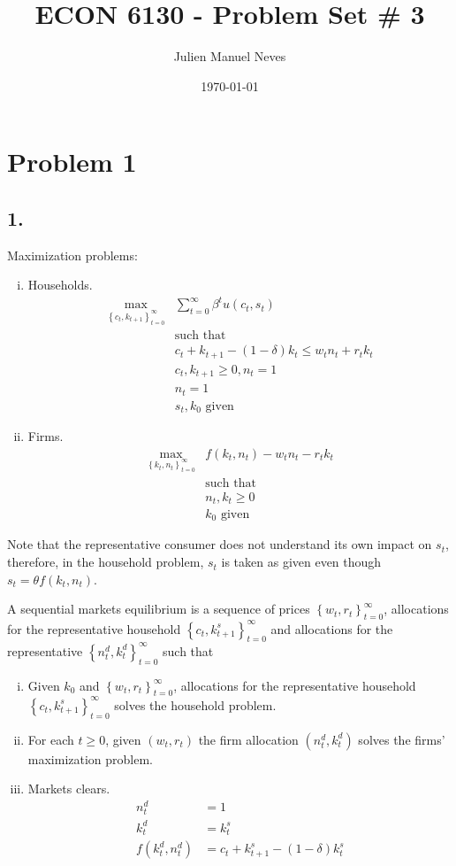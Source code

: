 \documentclass[12pt]{article}
\title{ECON 6130 - Problem Set \# 3}
\date{\today}
\author{Julien Manuel Neves}
\theoremstyle{definition}
\newcommand\st{\text{such that }}
\newcommand{\cbra}[1]{\left\{#1\right\}}
\begin{document}
\maketitle

\section*{Problem 1}
\subsection*{1.}
Maximization problems:
\begin{enumerate}[(i)]
	\item Households.
	\begin{align*}
	 \max_{\cbra{c_t,k_{t+1}}_{t=0}^\infty} &\sum_{t=0}^{\infty}\beta^t u(c_t,s_t)\\
	 &\st\\
	 & c_t+k_{t+1}-(1-\delta)k_t \leq w_tn_t+r_tk_t\\
	 & c_t,k_{t+1}\geq 0, n_t=1\\
	 & n_t= 1\\
	 & s_t,k_0 \text{ given}
	\end{align*}
	\item Firms.
	\begin{align*}
	\max_{\cbra{k_t,n_{t}}_{t=0}^\infty} & f(k_t,n_t)-w_tn_t-r_tk_t\\
	&\st\\
	& n_t,k_{t}\geq 0\\
	& k_0 \text{ given}
	\end{align*}
\end{enumerate}
Note that the representative consumer does not understand its own impact on $s_t$, therefore, in the household problem, $s_t$ is taken as given even though $s_t=\theta f(k_t,n_t)$. 

A sequential markets equilibrium is a sequence of prices $\cbra{w_t,r_{t}}_{t=0}^\infty$, allocations for the representative household $\cbra{c_t,k^s_{t+1}}_{t=0}^\infty$ and allocations for the representative  $\cbra{n^d_t,k^d_{t}}_{t=0}^\infty$ such that
\begin{enumerate}[(i)]
	\item Given $k_0$ and $\cbra{w_t,r_{t}}_{t=0}^\infty$, allocations for the representative household $\cbra{c_t,k^s_{t+1}}_{t=0}^\infty$ solves the household problem.
	\item For each $t\geq 0$, given $(w_t,r_t)$ the firm allocation $(n^d_t,k_t^d)$ solves the firms' maximization problem.
	\item Markets clears.
	\begin{align*}
		n_t^d&=1\\
		k_t^d&=k_t^s\\
		f(k_t^d,n_t^d) & = c_t+k^s_{t+1}-(1-\delta)k^s_t
	\end{align*}
\end{enumerate}
\end{document}
